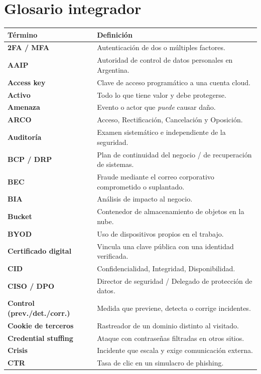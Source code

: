 \documentclass[12pt,a4paper]{article}
\begin{document}
\clearpage
\section*{Glosario integrador}

{\small
\begin{tabularx}{\textwidth}{>{\bfseries}p{4.2cm}X}
\toprule
T\'ermino & Definici\'on \\
\midrule
2FA / MFA & Autenticaci\'on de dos o m\'ultiples factores. \\
AAIP & Autoridad de control de datos personales en Argentina. \\
Access key & Clave de acceso program\'atico a una cuenta cloud. \\
Activo & Todo lo que tiene valor y debe protegerse. \\
Amenaza & Evento o actor que \emph{puede} causar da\~no. \\
ARCO & Acceso, Rectificaci\'on, Cancelaci\'on y Oposici\'on. \\
Auditor\'ia & Examen sistem\'atico e independiente de la seguridad. \\
BCP / DRP & Plan de continuidad del negocio / de recuperaci\'on de sistemas. \\
BEC & Fraude mediante el correo corporativo comprometido o suplantado. \\
BIA & An\'alisis de impacto al negocio. \\
Bucket & Contenedor de almacenamiento de objetos en la nube. \\
BYOD & Uso de dispositivos propios en el trabajo. \\
Certificado digital & Vincula una clave p\'ublica con una identidad verificada. \\
CID & Confidencialidad, Integridad, Disponibilidad. \\
CISO / DPO & Director de seguridad / Delegado de protecci\'on de datos. \\
Control (prev./det./corr.) & Medida que previene, detecta o corrige incidentes. \\
Cookie de terceros & Rastreador de un dominio distinto al visitado. \\
Credential stuffing & Ataque con contrase\~nas filtradas en otros sitios. \\
Crisis & Incidente que escala y exige comunicaci\'on externa. \\
CTR & Tasa de clic en un simulacro de phishing. \\

\end{tabularx}}
\end{document}

